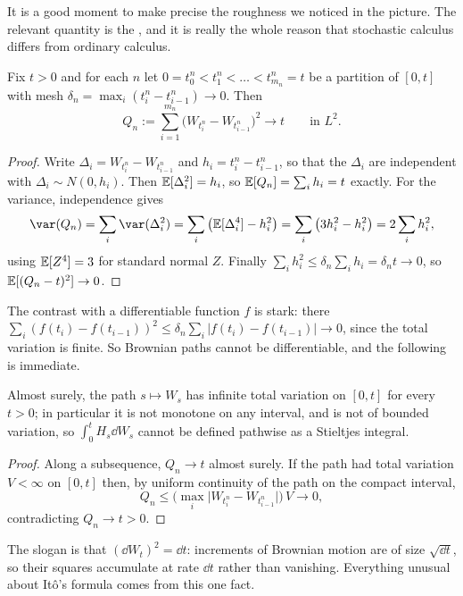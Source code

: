 \documentclass[a4paper]{scrartcl}
\begin{document}
It is a good moment to make precise the roughness we noticed in the picture. The relevant quantity is the , and it is really the whole reason that stochastic calculus differs from ordinary calculus.

\begin{theorem}\label{thm:qv}
	Fix $t>0$ and for each $n$ let $0 = t^n_0 < t^n_1 < \dots < t^n_{m_n} = t$ be a partition of $[0,t]$ with mesh $\delta_n = \max_i(t^n_i - t^n_{i-1}) \to 0$. Then
	$$
	Q_n := \sum_{i=1}^{m_n}\big(W_{t^n_i} - W_{t^n_{i-1}}\big)^2 \longrightarrow t \qquad\text{in } L^2.
	$$
\end{theorem}

\begin{proof}
	Write $\Delta_i = W_{t^n_i}-W_{t^n_{i-1}}$ and $h_i = t^n_i - t^n_{i-1}$, so that the $\Delta_i$ are independent with $\Delta_i \sim N(0,h_i)$. Then $\mathbb{E}[\Delta_i^2] = h_i$, so $\mathbb{E}[Q_n] = \sum_i h_i = t$ exactly. For the variance, independence gives
	$$
	\var(Q_n) = \sum_{i}\var(\Delta_i^2) = \sum_i \big(\EE[\Delta_i^4] - h_i^2\big) = \sum_i \big(3h_i^2 - h_i^2\big) = 2\sum_i h_i^2,
	$$
	using $\mathbb{E}[Z^4] = 3$ for standard normal $Z$. Finally $\sum_i h_i^2 \leq \delta_n\sum_i h_i = \delta_n t \to 0$, so $\mathbb{E}[(Q_n - t)^2]\to0$.
\end{proof}

The contrast with a differentiable function $f$ is stark: there $\sum_i(f(t_i)-f(t_{i-1}))^2 \leq \delta_n\sum_i|f(t_i)-f(t_{i-1})|\to0$, since the total variation is finite. So Brownian paths cannot be differentiable, and the following is immediate.

\begin{corollary}
	Almost surely, the path $s \mapsto W_s$ has infinite total variation on $[0,t]$ for every $t>0$; in particular it is not monotone on any interval, and is not of bounded variation, so $\int_0^t H_s\dd W_s$ cannot be defined pathwise as a Stieltjes integral.
\end{corollary}

\begin{proof}
	Along a subsequence, $Q_n \to t$ almost surely. If the path had total variation $V < \infty$ on $[0,t]$ then, by uniform continuity of the path on the compact interval,
	$$
	Q_n \leq \Big(\max_i \big|W_{t^n_i} - W_{t^n_{i-1}}\big|\Big)\, V \longrightarrow 0,
	$$
	contradicting $Q_n \to t > 0$.
\end{proof}

The slogan is that $(\dd W_t)^2 = \dd t$: increments of Brownian motion are of size $\sqrt{\dd t}$, so their squares accumulate at rate $\dd t$ rather than vanishing. Everything unusual about It\^o's formula comes from this one fact.
\end{document}
